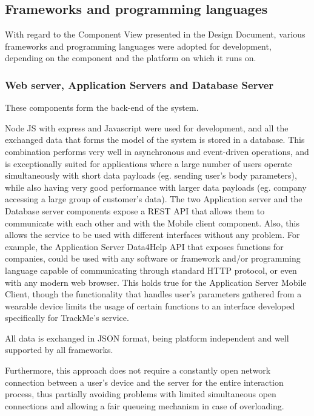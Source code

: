 \documentclass[../main.tex]{subfiles}
\begin{document}
\subsection{Frameworks and programming languages}

With regard to the Component View presented in the Design Document, various frameworks and programming languages were adopted for development, depending on the component and the platform on which it runs on.

\subsubsection{Web server, Application Servers and Database Server}

These components form the back-end of the system.

Node JS with express and Javascript were used for development, and all the exchanged data that forms the model of the system is stored in a database. This combination performs very well in asynchronous and event-driven operations, and is exceptionally suited for applications where a large number of users operate simultaneously with short data payloads (eg. sending user's body parameters), while also having very good performance with larger data payloads (eg. company accessing a large group of customer's data). The two Application server and the Database server components expose a REST API that allows them to communicate with each other and with the Mobile client component. Also, this allows the service to be used with different interfaces without any problem. For example, the Application Server Data4Help API that exposes functions for companies, could be used with any software or framework and/or programming language capable of communicating through standard HTTP protocol, or even with any modern web browser. This holds true for the Application Server Mobile Client, though the functionality that handles user's parameters gathered from a wearable device limits the usage of certain functions to an interface developed specifically for TrackMe's service.

All data is exchanged in JSON format, being platform independent and well supported by all frameworks.

Furthermore, this approach does not require a constantly open network connection between a user's device and the server for the entire interaction process, thus partially avoiding problems with limited simultaneous open connections and allowing a fair queueing mechanism in case of overloading.
\end{document}
